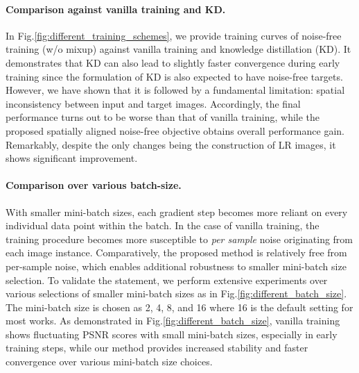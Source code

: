 \documentclass[letterpaper]{article} %
\begin{document}
\paragraph{Comparison against vanilla training and KD.}
In Fig.\ref{fig:different_training_schemes}, we provide training curves of noise-free training (w/o mixup) against vanilla training and knowledge distillation (KD).
It demonstrates that KD can also lead to slightly faster convergence during early training since the formulation of KD is also expected to have noise-free targets. However, we have shown that it is followed by a fundamental limitation: spatial inconsistency between input and target images. Accordingly, the final performance turns out to be worse than that of vanilla training, while the proposed spatially aligned noise-free objective obtains overall performance gain.
%
Remarkably, despite the only changes being the construction of LR images, it shows significant improvement.



\paragraph{Comparison over various batch-size.}
With smaller mini-batch sizes, each gradient step becomes more reliant on every individual data point within the batch. In the case of vanilla training, the training procedure becomes more susceptible to \textit{per sample} noise originating from each image instance.
Comparatively, the proposed method is relatively free from per-sample noise, which enables additional robustness to smaller mini-batch size selection. To validate the statement, we perform extensive experiments over various selections of smaller mini-batch sizes as in Fig.\ref{fig:different_batch_size}.
The mini-batch size is chosen as 2, 4, 8, and 16 where 16 is the default setting for most works.
%
As demonstrated in Fig.\ref{fig:different_batch_size}, vanilla training shows fluctuating PSNR scores with small mini-batch sizes, especially in early training steps, while our method provides increased stability and faster convergence over various mini-batch size choices.
\end{document}
